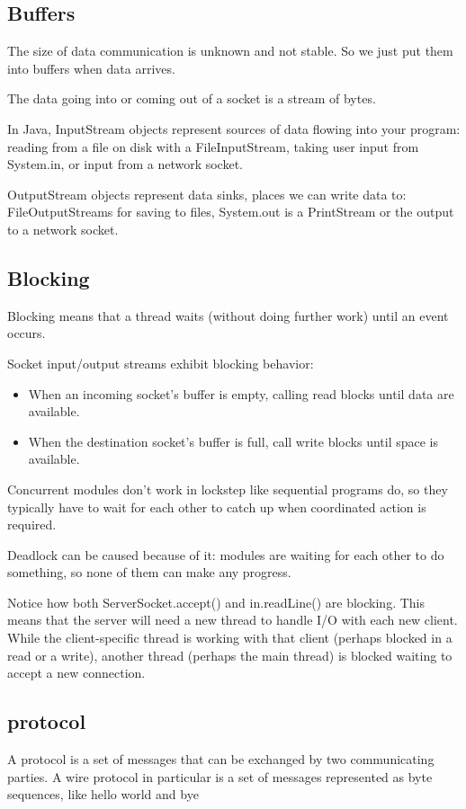 \documentclass[letterpaper,12pt]{article}
\begin{document}
\subsection{Buffers}
The size of data communication is unknown and not stable. So we just put them into buffers when data arrives. 

The data going into or coming out of a socket is a stream of bytes.

In Java, InputStream objects represent sources of data flowing into your program: reading from a file on disk with a FileInputStream, taking user input from System.in, or input from a network socket.

OutputStream objects represent data sinks, places we can write data to: FileOutputStreams for saving to files, System.out is a PrintStream or the output to a network socket.

\subsection{Blocking}
Blocking means that a thread waits (without doing further work) until an event occurs.

Socket input/output streams exhibit blocking behavior:\begin{itemize}
      \item When an incoming socket's buffer is empty, calling read blocks until data are available.
      \item When the destination socket's buffer is full, call write blocks until space is available.
\end{itemize}

Concurrent modules don't work in lockstep like sequential programs do, so they typically have to wait for each other to catch up when coordinated action is required.

Deadlock can be caused because of it: modules are waiting for each other to do something, so none of them can make any progress.

Notice how both ServerSocket.accept() and in.readLine() are blocking. This means that the server will need a new thread to handle I/O with each new client. While the client-specific thread is working with that client (perhaps blocked in a read or a write), another thread (perhaps the main thread) is blocked waiting to accept a new connection.
\subsection{protocol}
A protocol is a set of messages that can be exchanged by two communicating parties. A wire protocol in particular is a set of messages represented as byte sequences, like hello world and bye
\end{document}
